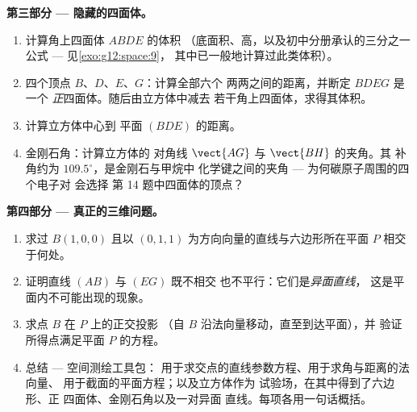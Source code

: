 \begin{problem}
\medskip
\noindent\textbf{第三部分 --- 隐藏的四面体。}
\begin{enumerate}[resume]
  \item 计算角上四面体 $ABDE$ 的体积
        （底面积、高，以及初中分册承认的三分之一公式
        --- 见\cref{exo:g12:space:9}，
        其中已一般地计算过此类体积）。
  \item 四个顶点 $B$、$D$、$E$、$G$：计算全部六个
        两两之间的距离，并断定 $BDEG$ 是一个
        \emph{正}四面体。随后由立方体中减去
        若干角上四面体，求得其体积。
  \item 计算立方体中心到
        平面 $(BDE)$ 的距离。
  \item 金刚石角：计算立方体的
        对角线 $\vect{AG}$ 与 $\vect{BH}$ 的夹角。其
        补角约为 $109.5^\circ$，是金刚石与甲烷中
        化学键之间的夹角 --- 为何碳原子周围的四个电子对
        会选择
        第 14 题中四面体的顶点？
\end{enumerate}

\medskip
\noindent\textbf{第四部分 --- 真正的三维问题。}
\begin{enumerate}[resume]
  \item 求过 $B(1,0,0)$ 且以
        $(0,1,1)$ 为方向向量的直线与六边形所在平面 $P$ 相交于何处。
  \item 证明直线 $(AB)$ 与 $(EG)$ 既不相交
        也不平行：它们是\emph{异面直线}，
        这是平面内不可能出现的现象。
  \item 求点 $B$ 在 $P$ 上的正交投影
        （自 $B$ 沿法向量移动，直至到达平面），并
        验证所得点满足平面 $P$ 的方程。
  \item 总结 --- 空间测绘工具包：
        用于求交点的直线参数方程、用于求角与距离的法向量、
        用于截面的平面方程；以及立方体作为
        试验场，在其中得到了六边形、正
        四面体、金刚石角以及一对异面
        直线。每项各用一句话概括。
\end{enumerate}
\end{problem}
